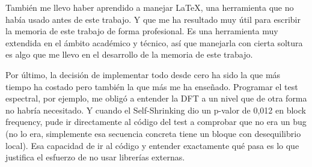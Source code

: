 También me llevo haber aprendido a manejar \LaTeX{}, una herramienta que no había usado antes de este trabajo. Y que me ha resultado muy útil para escribir la memoria de este trabajo de forma profesional.
Es una herramienta muy extendida en el ámbito académico y técnico, así que manejarla con cierta soltura es algo que me llevo en el desarrollo de la memoria de este trabajo.

Por último, la decisión de implementar todo desde cero ha sido la que más tiempo ha costado pero también la que más me ha enseñado.
Programar el test espectral, por ejemplo, me obligó a entender la DFT a un nivel que de otra forma no habría necesitado.
Y cuando el Self-Shrinking dio un p-valor de 0,012 en block frequency, pude ir directamente al código del test a comprobar que no era un bug
(no lo era, simplemente esa secuencia concreta tiene un bloque con desequilibrio local). Esa capacidad de ir al código y entender exactamente qué pasa
es lo que justifica el esfuerzo de no usar librerías externas.
